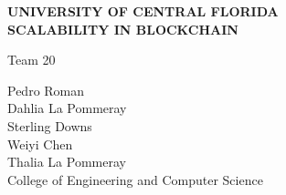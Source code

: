 \makeatletter
\begin{titlepage}
\begin{center}

\uppercase{\textbf{\large{University of Central Florida}}}
\\[7cm]

\uppercase{\textbf{\large{Scalability in Blockchain}}}

\vfill
Team 20

Pedro Roman\\
Dahlia La Pommeray\\
Sterling Downs\\
Weiyi Chen\\
Thalia La Pommeray
\\[3cm]

College of Engineering and Computer Science

\@date

\end{center}
\end{titlepage}
\makeatother